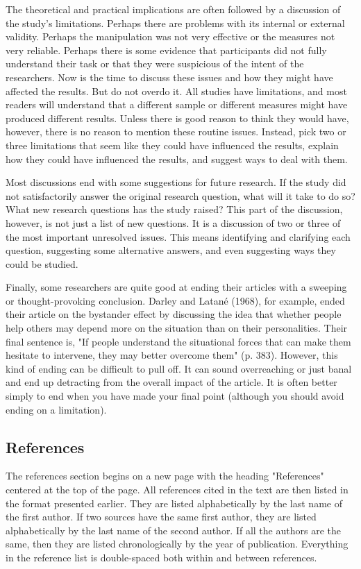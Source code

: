 The theoretical and practical implications are often followed by a discussion of the study's limitations. Perhaps there are problems with its internal or external validity. Perhaps the manipulation was not very effective or the measures not very reliable. Perhaps there is some evidence that participants did not fully understand their task or that they were suspicious of the intent of the researchers. Now is the time to discuss these issues and how they might have affected the results. But do not overdo it. All studies have limitations, and most readers will understand that a different sample or different measures might have produced different results. Unless there is good reason to think they would have, however, there is no reason to mention these routine issues. Instead, pick two or three limitations that seem like they could have influenced the results, explain how they could have influenced the results, and suggest ways to deal with them.

Most discussions end with some suggestions for future research. If the study did not satisfactorily answer the original research question, what will it take to do so? What new research questions has the study raised? This part of the discussion, however, is not just a list of new questions. It is a discussion of two or three of the most important unresolved issues. This means identifying and clarifying each question, suggesting some alternative answers, and even suggesting ways they could be studied.

Finally, some researchers are quite good at ending their articles with a sweeping or thought-provoking conclusion. Darley and Latané (1968), for example, ended their article on the bystander effect by discussing the idea that whether people help others may depend more on the situation than on their personalities. Their final sentence is, "If people understand the situational forces that can make them hesitate to intervene, they may better overcome them" (p. 383). However, this kind of ending can be difficult to pull off. It can sound overreaching or just banal and end up detracting from the overall impact of the article. It is often better simply to end when you have made your final point (although you should avoid ending on a limitation).

\subsection{References}

The references section begins on a new page with the heading "References" centered at the top of the page. All references cited in the text are then listed in the format presented earlier. They are listed alphabetically by the last name of the first author. If two sources have the same first author, they are listed alphabetically by the last name of the second author. If all the authors are the same, then they are listed chronologically by the year of publication. Everything in the reference list is double-spaced both within and between references.


